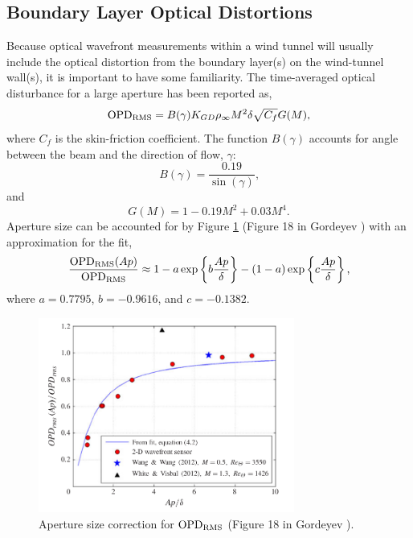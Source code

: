 \subsection{Boundary Layer Optical Distortions}
Because optical wavefront measurements within a wind tunnel will usually include the optical distortion from the boundary layer(s) on the wind-tunnel wall(s), it is important to have some familiarity.
The time-averaged optical disturbance for a large aperture has been reported as,
\begin{equation}
  \operatorname{OPD_{RMS}} = B(\gamma)K_{GD}\rho_\infty M^2\delta\sqrt{C_f}G(M) \textrm{,}
  \label{eqn:02_opdrms_gor}
\end{equation}
where $C_f$ is the skin-friction coefficient.
The function $B(\gamma)$ accounts for angle between the beam and the direction of flow, $\gamma$:
\begin{equation}
  B(\gamma) = \frac{0.19}{\sin(\gamma)} \textrm{,}
\end{equation}
and
\begin{equation}
  G(M) = 1-0.19M^2+0.03M^4 \textrm{.}
\end{equation}
Aperture size can be accounted for by Figure \ref{fig:02_gordeyev_2014} (Figure 18 in Gordeyev \cite{Gordeyev-2014-jcJndkHM}) with an approximation for the fit,
\begin{equation}
  \frac{\operatorname{OPD_{RMS}}(Ap)}{\operatorname{OPD_{RMS}}} \approx 1-a\exp\left\{b\frac{Ap}{\delta}\right\}-(1-a)\exp\left\{c\frac{Ap}{\delta}\right\} \textrm{,}
  \label{eqn:02_opdrms_gor_fit}
\end{equation}
where $a=0.7795$, $b=-0.9616$, and $c=-0.1382$.
\begin{figure}
  \centering
  \includegraphics[width=0.75\textwidth]{../other-sources/gordeyev_2014_figure_18.png}
  \caption{Aperture size correction for $\operatorname{OPD_{RMS}}$ (Figure 18 in Gordeyev \cite{Gordeyev-2014-jcJndkHM}).}
  \label{fig:02_gordeyev_2014}
\end{figure}

